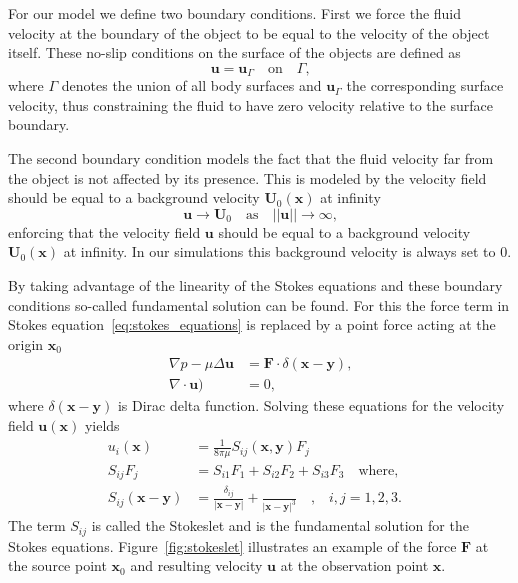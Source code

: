 \documentclass[a4paper,11pt]{kth-mag}
\begin{document}
For our model we define two boundary conditions. First we force the fluid velocity at the boundary of the object to be equal to the velocity of the object itself. These no-slip conditions on the surface of the objects are defined as
\begin{equation}
  \label{eq:boundary_condition_surface}
  \mathbf{u} = \mathbf{u}_\Gamma  \quad \text{on} \quad  \Gamma \text{,}
\end{equation}
where $\Gamma$ denotes the union of all body surfaces and $\mathbf{u}_\Gamma$ the corresponding surface velocity, thus constraining the fluid to have zero velocity relative to the surface boundary.

The second boundary condition models the fact that the fluid velocity far from the object is not affected by its presence. This is modeled by the velocity field should be equal to a background velocity $\mathbf{U}_0(\mathbf{x})$ at infinity
\begin{equation}
  \label{eq:boundary_condition_background}
  \mathbf{u} \rightarrow \mathbf{U}_0 \quad \text{as} \quad ||\mathbf{u}|| \rightarrow \infty \text{,}
\end{equation}
enforcing that the velocity field $\mathbf{u}$ should be equal to a background velocity $\mathbf{U}_0(\mathbf{x})$ at infinity. In our simulations this background velocity is always set to $0$.

By taking advantage of the linearity of the Stokes equations and these boundary conditions so-called fundamental solution can be found. For this the force term in Stokes equation~\eqref{eq:stokes_equations} is replaced by a point force acting at the origin $\mathbf{x}_0$
\begin{equation}
  \label{eq:stokes_equations_point}
  \begin{aligned}
    \nabla p - \mu \Delta \mathbf{u} &= \mathbf{F} \cdot \delta(\mathbf{x} - \mathbf{y}) \text{,} \\
    \nabla \cdot \mathbf{u}) &= 0\text{,}
  \end{aligned}
\end{equation}
where $\delta(\mathbf{x}-\mathbf{y})$ is Dirac delta function. Solving these equations for the velocity field $\mathbf{u}(\mathbf{x})$ yields
\begin{equation}
  \label{eq:stokeslet}
  \begin{aligned}
    u_i(\mathbf{x}) &= \frac{1}{8\pi\mu}S_{ij}(\mathbf{x},\mathbf{y})F_j \\
    S_{ij}F_j &= S_{i1}F_1 + S_{i2}F_2 + S_{i3}F_3 \quad \text{where,} \quad \\
    S_{ij}(\mathbf{x} - \mathbf{y}) &= \frac{\delta_{ij}}{|\mathbf{x}-\mathbf{y}|} + \frac{}{|\mathbf{x}-\mathbf{y}|^3}\quad \text{,} \quad i,j=1,2,3\text{.}
  \end{aligned}
\end{equation}
The term $S_{ij}$ is called the Stokeslet and is the fundamental solution for the Stokes equations. Figure~\ref{fig:stokeslet} illustrates an example of the force $\mathbf{F}$ at the source point $\mathbf{x}_0$ and resulting velocity $\mathbf{u}$ at the observation point $\mathbf{x}$.
\end{document}
